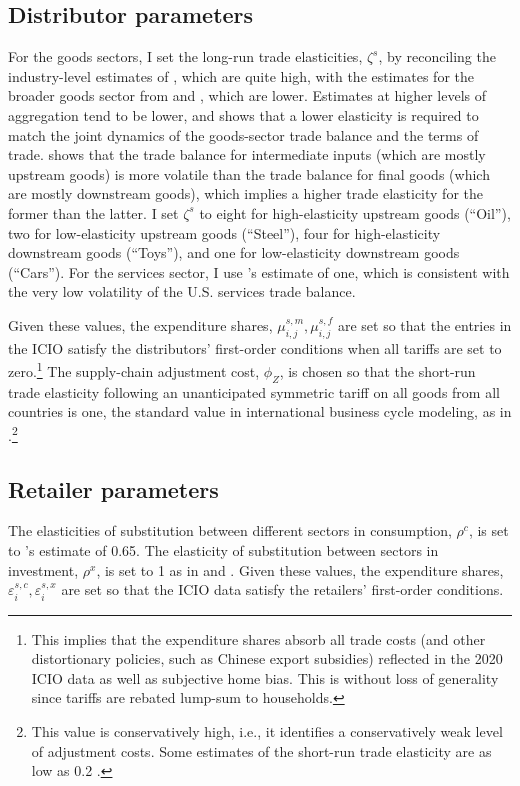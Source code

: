 \documentclass[12pt]{article}
\begin{document}
\subsection{Distributor parameters}
For the goods sectors, I set the long-run trade elasticities, $\zeta^s$, by reconciling the industry-level estimates of \citet{cp_2015}, which are quite high, with the estimates for the broader goods sector from \citet{KRS_2018} and \citet{gsg-dsd}, which are lower. Estimates at higher levels of aggregation tend to be lower, and \citet{KRS_2018} shows that a lower elasticity is required to match the joint dynamics of the goods-sector trade balance and the terms of trade. \citet{gsg-dsd} shows that the trade balance for intermediate inputs (which are mostly upstream goods) is more volatile than the trade balance for final goods (which are mostly downstream goods), which implies a higher trade elasticity for the former than the latter. I set $\zeta^s$ to eight for high-elasticity upstream goods (``Oil''), two for low-elasticity upstream goods (``Steel''), four for high-elasticity downstream goods (``Toys''), and one for low-elasticity downstream goods (``Cars''). For the services sector, I use \citet{KRS_2018}'s estimate of one, which is consistent with the very low volatility of the U.S. services trade balance.

Given these values, the expenditure shares, $\mu^{s,m}_{i,j},\mu^{s,f}_{i,j}$ are set so that the entries in the ICIO satisfy the distributors' first-order conditions when all tariffs are set to zero.\footnote{This implies that the expenditure shares absorb all trade costs (and other distortionary policies, such as Chinese export subsidies) reflected in the 2020 ICIO data as well as subjective home bias. This is without loss of generality since tariffs are rebated lump-sum to households.} The supply-chain adjustment cost, $\phi_Z$, is chosen so that the short-run trade elasticity following an unanticipated symmetric tariff on all goods from all countries is one, the standard value in international business cycle modeling, as in \citet{cje_nafta}.\footnote{This value is conservatively high, i.e., it identifies a conservatively weak level of adjustment costs. Some estimates of the short-run trade elasticity are as low as 0.2 \citep[see, e.g.,][]{ac_jcurve}.}

\subsection{Retailer parameters}
The elasticities of substitution between different sectors in consumption, $\rho^c$, is set to \citet{atalay}'s estimate of 0.65. The elasticity of substitution between sectors in investment, $\rho^x$, is set to 1 as in \cite{bems2008aggregate} and \citet{KRS_2018}. Given these values, the expenditure shares, $\varepsilon^{s,c}_i,\varepsilon^{s,x}_i$ are set so that the ICIO data satisfy the retailers' first-order conditions.
\end{document}
